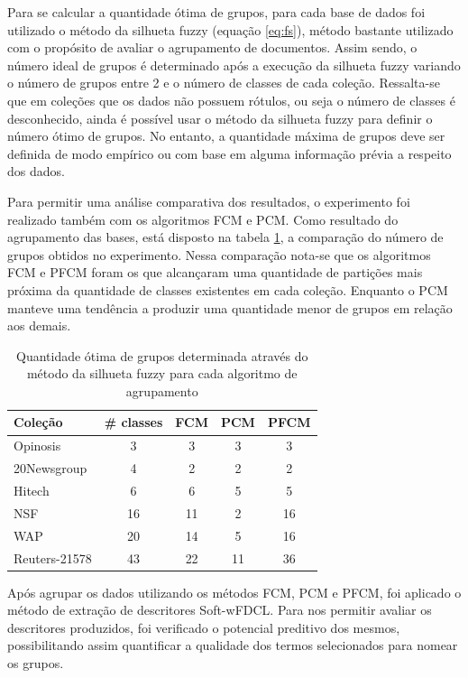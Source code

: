Para se calcular a quantidade ótima de grupos, para cada base de dados foi utilizado o
método da silhueta fuzzy (equação \ref{eq:fs}), método bastante utilizado com o propósito de avaliar
o agrupamento de documentos. Assim sendo, o número ideal de grupos é determinado após a execução da
silhueta fuzzy variando o número de grupos entre 2 e o número de classes de cada coleção.
Ressalta-se que em coleções que os dados não possuem rótulos, ou seja o número de classes é
desconhecido, ainda é possível usar o método da silhueta fuzzy para definir o número ótimo de
grupos. No entanto, a quantidade máxima de grupos deve ser definida de modo empírico ou com base em
alguma informação prévia a respeito dos dados. 

Para permitir uma análise comparativa dos resultados, o experimento foi realizado também com os
algoritmos FCM e PCM.
Como resultado do agrupamento das bases, está disposto na tabela \ref{table:pfcmclusters}, a
comparação do número de grupos obtidos no experimento. Nessa comparação nota-se que os algoritmos
FCM e PFCM foram os que alcançaram uma quantidade de partições mais próxima da quantidade de classes
existentes em cada coleção. Enquanto o PCM manteve uma tendência a produzir uma quantidade menor de
grupos em relação aos demais.

\begin{table}[!htp]
  \centering
  \begin{tabular}{ |l|c|c|c|c|}
    \hline
    {\bf Coleção} & {\bf \# classes} & {\bf FCM} & {\bf PCM} & {\bf PFCM} \\
    \hline
    Opinosis & 3 & 3 & 3 & 3 \\
    \hline
    20Newsgroup & 4 & 2 & 2 & 2 \\
    \hline
    Hitech & 6 & 6 & 5 & 5 \\
    \hline
    NSF & 16 & 11 & 2 & 16 \\
    \hline
    WAP & 20 & 14 & 5 & 16 \\
    \hline
    Reuters-21578 & 43 & 22 & 11 & 36 \\
    \hline
  \end{tabular}
  \caption{Quantidade ótima de grupos determinada através do método da silhueta fuzzy para cada
  algoritmo de agrupamento}
  \label{table:pfcmclusters}
\end{table}

Após agrupar os dados utilizando os métodos FCM, PCM e PFCM, foi aplicado o método de extração 
de descritores Soft-wFDCL. Para nos permitir avaliar os descritores produzidos, foi verificado o
potencial preditivo dos mesmos, possibilitando assim quantificar a qualidade dos
termos selecionados para nomear os grupos. 

